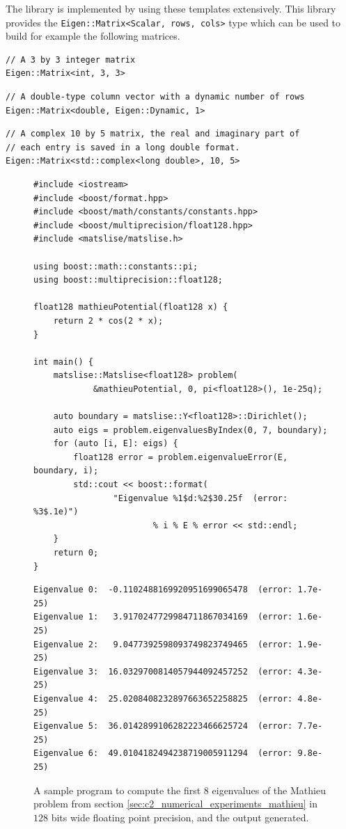 The library \Eigen{} is implemented by using these templates extensively. This library provides the \texttt{Eigen::Matrix<Scalar, rows, cols>} type which can be used to build for example the following matrices.
\begin{verbatim}
// A 3 by 3 integer matrix
Eigen::Matrix<int, 3, 3>
\end{verbatim}
\begin{verbatim}
// A double-type column vector with a dynamic number of rows
Eigen::Matrix<double, Eigen::Dynamic, 1>
\end{verbatim}
\begin{verbatim}
// A complex 10 by 5 matrix, the real and imaginary part of
// each entry is saved in a long double format.
Eigen::Matrix<std::complex<long double>, 10, 5> 
\end{verbatim}

\begin{figure}
\begin{verbatim}
#include <iostream>
#include <boost/format.hpp>
#include <boost/math/constants/constants.hpp>
#include <boost/multiprecision/float128.hpp>
#include <matslise/matslise.h>

using boost::math::constants::pi;
using boost::multiprecision::float128;

float128 mathieuPotential(float128 x) {
    return 2 * cos(2 * x);
}

int main() {
    matslise::Matslise<float128> problem(
            &mathieuPotential, 0, pi<float128>(), 1e-25q);

    auto boundary = matslise::Y<float128>::Dirichlet();
    auto eigs = problem.eigenvaluesByIndex(0, 7, boundary);
    for (auto [i, E]: eigs) {
        float128 error = problem.eigenvalueError(E, boundary, i);
        std::cout << boost::format(
                "Eigenvalue %1$d:%2$30.25f  (error: %3$.1e)")
                        % i % E % error << std::endl;
    }
    return 0;
}
\end{verbatim}
    \vspace{8mm}
\begin{verbatim}
Eigenvalue 0:  -0.1102488169920951699065478  (error: 1.7e-25)
Eigenvalue 1:   3.9170247729984711867034169  (error: 1.6e-25)
Eigenvalue 2:   9.0477392598093749823749465  (error: 1.9e-25)
Eigenvalue 3:  16.0329700814057944092457252  (error: 4.3e-25)
Eigenvalue 4:  25.0208408232897663652258825  (error: 4.8e-25)
Eigenvalue 5:  36.0142899106282223466625724  (error: 7.7e-25)
Eigenvalue 6:  49.0104182494238719005911294  (error: 9.8e-25)
\end{verbatim}
    \caption{A sample program to compute the first 8 eigenvalues of the Mathieu problem from section \ref{sec:c2_numerical_experiments_mathieu} in $128$ bits wide floating point precision, and the output generated.}
    \label{fig:c2_mathieu_quad_code}
\end{figure}

